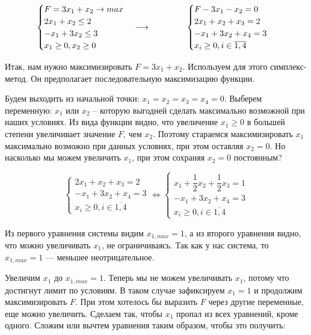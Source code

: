 \begin{align*}
    \begin{cases}
        F = 3x_1 + x_2\to max\\
        2x_1 + x_2 \leq 2\\
        -x_1 + 3 x_2 \leq 3\\
        x_1 \geq 0, x_2 \geq 0
    \end{cases} \longrightarrow
    \hspace{1.5cm}
    \begin{cases}
        F - 3x_1 - x_2 = 0\\
        2x_1 + x_2 + x_3 = 2\\
        -x_1 + 3x_2 + x_4 = 3\\
        x_{i} \geq 0, i\in\overline{1,4}
    \end{cases}
\end{align*}

Итак, нам нужно максимизировать $F = 3x_1 + x_2$. Используем для этого симплекс-метод. Он предполагает последовательную максимизацию
функции. 

Будем выходить из начальной точки: $x_1 = x_2 = x_3 = x_4 = 0$.
Выберем переменную: $x_1$ или $x_2$ -- которую выгодней сделать максимально возможной при наших условиях.
Из вида функции видно, что увеличение $x_1 \geq 0$ в большей степени увеличивает значение $F$, чем $x_2$.
Поэтому стараемся максимизировать $x_1$ максимально возможно при данных условиях, при этом оставляя $x_2 = 0$. 
Но насколько мы можем увеличить $x_1$, при этом сохраняя $x_2 = 0$ постоянным?

\[
    \begin{cases}
        2x_1 + x_2 + x_3 = 2\\
        -x_1 + 3x_2 + x_4 = 3\\
        x_{i} \geq 0, i\in\overline{1,4}
    \end{cases} 
    \Leftrightarrow
    \begin{cases}
        x_1 + \dfrac{1}{2}x_2 + \dfrac{1}{2}x_3 = 1\\ 
        -x_1 + 3x_2 + x_4 = 3\\
        x_{i} \geq 0, i\in\overline{1,4}
    \end{cases}
\]

Из первого уравнения системы видим $x_{1, max} = 1$, а из второго уравнения видно, что можно увеличивать $x_1$, не ограничиваясь.
Так как у нас система, то $x_{1, max} = 1$ --- меньшее неотрицательное.

Увеличим $x_1$ до $x_{1, max} = 1$. Теперь мы не можем увеличивать $x_1$, потому что достигнут лимит по условиям.
В таком случае зафиксируем $x_1 = 1$ и продолжим максимизировать $F$. При этом хотелось бы выразить $F$ через другие переменные,
еще можно увеличить. Сделаем так, чтобы $x_1$ пропал из всех уравнений, кроме одного. Сложим или вычтем уравнения таким образом, чтобы это получить:



